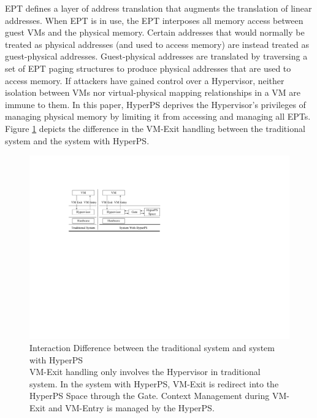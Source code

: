 EPT defines a layer of address translation that augments the translation of linear addresses. 
When EPT is in use, the EPT interposes all memory access between guest VMs and the physical memory. 
Certain addresses that would normally be treated as physical addresses (and used to access memory) are instead treated as guest-physical addresses. Guest-physical addresses are translated by traversing a set of EPT paging structures to produce physical addresses that are used to access memory.
If attackers have gained control over a Hypervisor, 
neither isolation between VMs nor virtual-physical mapping relationships in a VM are immune to them. 
In this paper, HyperPS deprives the Hypervisor's privileges of managing physical memory by limiting it from accessing and managing all EPTs. 
Figure \ref{fig:inter} depicts the difference in the VM-Exit handling between the traditional system and the system with HyperPS.
\begin{figure}[htpb]
    \centering
    \includegraphics[width=0.8\linewidth]{IMG/interaction.pdf}
    \caption{Interaction Difference between the traditional system and system with HyperPS \\ VM-Exit handling only involves the Hypervisor in traditional system. In the system with HyperPS, VM-Exit is redirect into the HyperPS Space through the Gate. Context Management during VM-Exit and VM-Entry is managed by the HyperPS.}%
    \label{fig:inter}
\end{figure}


